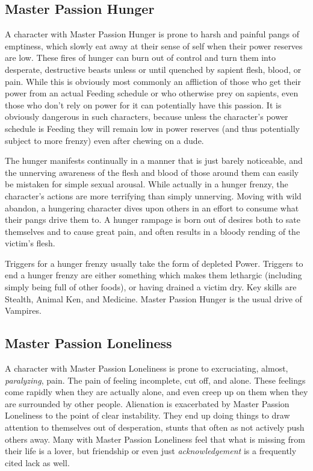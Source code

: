 \subsection{Master Passion Hunger}

A character with Master Passion Hunger is prone to harsh and painful pangs of emptiness, which slowly eat away at their sense of self when their power reserves are low. These fires of hunger can burn out of control and turn them into desperate, destructive beasts unless or until quenched by sapient flesh, blood, or pain. While this is obviously most commonly an affliction of those who get their power from an actual Feeding schedule or who otherwise prey on sapients, even those who don't rely on power for it can potentially have this passion. It is obviously dangerous in such characters, because unless the character's power schedule is Feeding they will remain low in power reserves (and thus potentially subject to more frenzy) even after chewing on a dude. 

The hunger manifests continually in a manner that is just barely noticeable, and the unnerving awareness of the flesh and blood of those around them can easily be mistaken for simple sexual arousal. While actually in a hunger frenzy, the character's actions are more terrifying than simply unnerving. Moving with wild abandon, a hungering character dives upon others in an effort to consume what their pangs drive them to. A hunger rampage is born out of desires both to sate themselves and to cause great pain, and often results in a bloody rending of the victim's flesh.

Triggers for a hunger frenzy usually take the form of depleted Power. Triggers to end a hunger frenzy are either something which makes them lethargic (including simply being full of other foods), or having drained a victim dry. Key skills are Stealth, Animal Ken, and Medicine. Master Passion Hunger is the usual drive of Vampires.

\subsection{Master Passion Loneliness}

A character with Master Passion Loneliness is prone to excruciating, almost, \textit{paralyzing}, pain. The pain of feeling incomplete, cut off, and alone. These feelings come rapidly when they are actually alone, and even creep up on them when they are surrounded by other people. Alienation is exacerbated by Master Passion Loneliness to the point of clear instability. They end up doing things to draw attention to themselves out of desperation, stunts that often as not actively push others away. Many with Master Passion Loneliness feel that what is missing from their life is a lover, but friendship or even just \textit{acknowledgement} is a frequently cited lack as well. 

